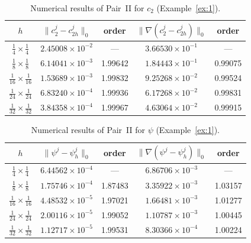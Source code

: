 \begin{table}[htbp]
\centering
\caption{Numerical results of Pair~II for $c_{2}$ (Example~\ref{ex:1}).}
\label{tab:PairII-c2}
\begin{tabular}{ccccc}
\hline
$h$ &
$\|c_{2}^{j} - c_{2h}^{j}\|_{0}$ & order &
$\|\nabla(c_{2}^{j} - c_{2h}^{j})\|_{0}$ & order \\
\hline
$\tfrac{1}{4} \times \tfrac{1}{4}$   & $2.45008\times10^{-2}$ & ---     & $3.66530\times10^{-1}$ & ---     \\
$\tfrac{1}{8} \times \tfrac{1}{8}$   & $6.14041\times10^{-3}$ & 1.99642 & $1.84443\times10^{-1}$ & 0.99075 \\
$\tfrac{1}{16}\times \tfrac{1}{16}$  & $1.53689\times10^{-3}$ & 1.99832 & $9.25268\times10^{-2}$ & 0.99524 \\
$\tfrac{1}{24}\times \tfrac{1}{24}$  & $6.83240\times10^{-4}$ & 1.99936 & $6.17268\times10^{-2}$ & 0.99831 \\
$\tfrac{1}{32}\times \tfrac{1}{32}$  & $3.84358\times10^{-4}$ & 1.99967 & $4.63064\times10^{-2}$ & 0.99915 \\
\hline
\end{tabular}
\end{table}

\begin{table}[htbp]
\centering
\caption{Numerical results of Pair~II for $\psi$ (Example~\ref{ex:1}).}
\label{tab:PairII-psi}
\begin{tabular}{ccccc}
\hline
$h$ &
$\|\psi^{j} - \psi_{h}^{j}\|_{0}$ & order &
$\|\nabla(\psi^{j} - \psi_{h}^{j})\|_{0}$ & order \\
\hline
$\tfrac{1}{4} \times \tfrac{1}{4}$   & $6.44562\times10^{-4}$ & ---     & $6.86706\times10^{-3}$ & ---     \\
$\tfrac{1}{8} \times \tfrac{1}{8}$   & $1.75746\times10^{-4}$ & 1.87483 & $3.35922\times10^{-3}$ & 1.03157 \\
$\tfrac{1}{16}\times \tfrac{1}{16}$  & $4.48532\times10^{-5}$ & 1.97021 & $1.66481\times10^{-3}$ & 1.01277 \\
$\tfrac{1}{24}\times \tfrac{1}{24}$  & $2.00116\times10^{-5}$ & 1.99052 & $1.10787\times10^{-3}$ & 1.00445 \\
$\tfrac{1}{32}\times \tfrac{1}{32}$  & $1.12717\times10^{-5}$ & 1.99531 & $8.30366\times10^{-4}$ & 1.00224 \\
\hline
\end{tabular}
\end{table}

